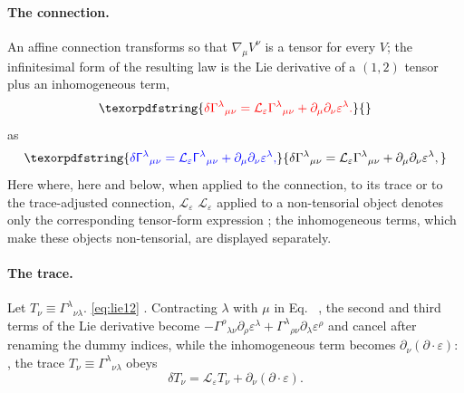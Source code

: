 \documentclass[prd,aps,preprint,superscriptaddress,nofootinbib,amsmath,amssymb,eqsecnum]{revtex4-2}
\providecommand{\DIFaddtex}[1]{{\protect\color{blue} \sf #1}} %
\providecommand{\DIFdeltex}[1]{{\protect\color{red} \scriptsize #1}} %
\providecommand{\DIFaddbegin}{} %
\providecommand{\DIFaddend}{} %
\providecommand{\DIFdelbegin}{} %
\providecommand{\DIFdelend}{} %
\providecommand{\DIFadd}[1]{\texorpdfstring{\DIFaddtex{#1}}{#1}} %
\providecommand{\DIFdel}[1]{\texorpdfstring{\DIFdeltex{#1}}{}} %
\begin{document}
\paragraph{The connection.} An affine connection transforms \DIFdelbegin \DIFdel{so that $\nabla_\mu V^\nu$ is a
tensor for every $V$; the infinitesimal form of the resulting law is the Lie derivative of a
$(1,2)$ tensor plus an inhomogeneous term,
}\begin{displaymath}
\DIFdel{\delta\Gamma^{\lambda}{}_{\mu\nu}=\mathcal{L}_\varepsilon\Gamma^{\lambda}{}_{\mu\nu}
+\partial_\mu\partial_\nu\varepsilon^\lambda .
}\end{displaymath}%
\DIFdelend \DIFaddbegin \DIFadd{as
}\begin{equation}
\DIFadd{\delta\Gamma^{\lambda}{}_{\mu\nu}=\mathcal{L}_\varepsilon\Gamma^{\lambda}{}_{\mu\nu}
+\partial_\mu\partial_\nu\varepsilon^\lambda ,
\label{eq:dGamma}
}\end{equation}\DIFaddend 
\DIFdelbegin \DIFdel{Here }\DIFdelend \DIFaddbegin \DIFadd{where, here }\DIFaddend and below, \DIFdelbegin \DIFdel{when applied to the connection, to its trace or to the trace-adjusted
connection, $\mathcal{L}_\varepsilon$ }\DIFdelend \DIFaddbegin \DIFadd{$\mathcal{L}_\varepsilon$ applied to a non-tensorial object }\DIFaddend denotes
only the \DIFdelbegin \DIFdel{corresponding }\DIFdelend tensor-form expression \DIFdelbegin \DIFdel{;
the inhomogeneous terms, which make these objects non-tensorial, are displayed separately. }%

\paragraph{\DIFdel{The trace.}} %
\addtocounter{paragraph}{-1}%
\DIFdel{Let $T_\nu\equiv\Gamma^{\lambda}{}_{\nu\lambda}$. }\DIFdelend \DIFaddbegin \eqref{eq:lie12}\DIFadd{. }\DIFaddend Contracting $\lambda$ with $\mu$\DIFdelbegin \DIFdel{in Eq.~}%
\DIFdel{, the
second and third terms of the Lie derivative
}%
\DIFdel{become $-\Gamma^{\rho}{}_{\lambda\nu}\partial_\rho\varepsilon^\lambda
+\Gamma^{\lambda}{}_{\rho\nu}\partial_\lambda\varepsilon^\rho$ and cancel after renaming the
dummy indices, while the inhomogeneous term becomes $\partial_\nu(\partial\!\cdot\!\varepsilon)$:
}\DIFdelend \DIFaddbegin \DIFadd{, the
trace $T_\nu\equiv\Gamma^{\lambda}{}_{\nu\lambda}$ obeys
}\DIFaddend \begin{equation}
\delta T_\nu=\mathcal{L}_\varepsilon T_\nu+\partial_\nu(\partial\!\cdot\!\varepsilon).
\label{eq:dT}
\end{equation}
\DIFdelbegin %
\end{document}

